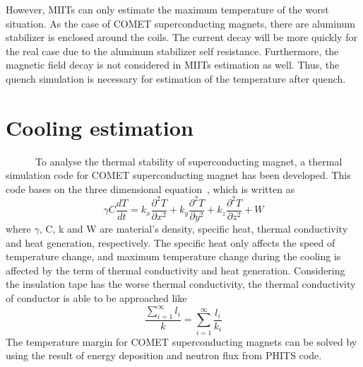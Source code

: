 However, MIITs can only estimate the maximum temperature of the worst situation.
As the case of COMET superconducting magnets, there are aluminum stabilizer is enclosed around the coils.
The current decay will be more quickly for the real case due to the aluminum stabilizer self resistance.
Furthermore, the magnetic field decay is not considered in MIITs estimation as well.
Thus, the quench simulation is necessary for estimation of the temperature after quench.


 \section{Cooling estimation}
~~~~~~To analyse the thermal stability of superconducting magnet, a thermal simulation code for COMET superconducting magnet has been developed.
This code bases on the three dimensional equation~\cite{heat}, which is written as
\begin{equation}
 \gamma C \frac{dT}{dt} = k_x \frac{\partial^2 T}{\partial x^2} + k_y \frac{\partial^2 T}{\partial y^2} + k_z \frac{\partial^2 T}{\partial z^2} + W
\end{equation}
where $\gamma$, C, k and W are material's density, specific heat, thermal conductivity and heat generation, respectively.
The specific heat only affects the speed of temperature change, and maximum temperature change during the cooling is affected by the term of thermal conductivity and heat generation.
Considering the insulation tape has the worse thermal conductivity, the thermal conductivity of conductor is able to be approached like
\begin{equation}
 \frac{\sum^{\infty}_{i=1}l_i}{k} = \sum^{\infty}_{i=1} \frac{l_i}{k_i}
\end{equation}
The temperature margin for COMET superconducting magnets can be solved by using the result of energy deposition and neutron flux from PHITS code.

